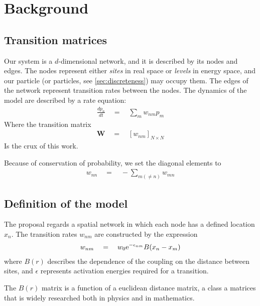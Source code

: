 \chapter{Background}

 
\section{Transition matrices}

Our system is a $d$-dimensional network, and it is
described by its nodes and edges. The nodes represent 
either {\em sites} in real space or {\em levels} in energy space, 
and our particle (or particles, see \ref{sec:discreteness}) may
occupy them. The edges of the network represent transition rates 
between the nodes. The dynamics of the model are described by 
a rate equation:
%
\begin{align}
\frac{dp_n}{dt} \quad = \quad \sum_m w_{nm}p_m
\end{align}
%
Where the transition matrix 
%
\begin{align}
\mathbf{W} \quad =  \quad \left[ w_{nm}\right]_{N\times N}
\end{align}
%
Is the crux of this work.

Because of conservation of probability, we set the diagonal
elements to
%
\begin{align}
w_{nn}\quad = \quad -\sum_{m(\ne n)} w_{mn}
\end{align}
%


\section{Definition of the model}


The proposal regards a spatial network in which each node
has a defined location $x_n$. The transition rates $w_{nm}$
are constructed by the expression
%
\begin{align}
w_{nm} \quad = \quad w_0 \mbox{e}^{-\epsilon_{nm}}B(x_n-x_m)
\end{align}
%
where $B(r)$ describes the dependence of the coupling on the
distance between sites, and $\epsilon$ represents activation
energies required for a transition.


The $B(r)$ matrix is a function of a euclidean distance matrix,
a class a matrices that is widely researched 
\cite{skipetrov_eigenvalue_2011, goetschy_non-hermitian_2011,mezard_spectra_1999, bogomolny_spectral_2003}
both in physics and in mathematics.


